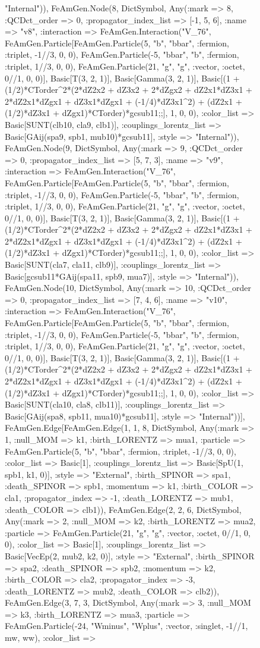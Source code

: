 \documentclass{revtex4}
\begin{document}
\begin{figure}[!htb]
\begin{center}
{"Internal")), FeAmGen.Node(8, Dict{Symbol, Any}(:mark => 8, :QCDct_order => 0, :propagator_index_list => [-1, 5, 6], :name => "v8", :interaction => FeAmGen.Interaction("V_76", FeAmGen.Particle[FeAmGen.Particle(5, "b", "bbar", :fermion, :triplet, -1//3, 0, 0), FeAmGen.Particle(-5, "bbar", "b", :fermion, :triplet, 1//3, 0, 0), FeAmGen.Particle(21, "g", "g", :vector, :octet, 0//1, 0, 0)], Basic[T(3, 2, 1)], Basic[Gamma(3, 2, 1)], Basic[(1 + (1/2)*CTorder^2*(2*dZ2x2 + dZ3x2 + 2*dZgx2 + dZ2x1*dZ3x1 + 2*dZ2x1*dZgx1 + dZ3x1*dZgx1 + (-1/4)*dZ3x1^2) + (dZ2x1 + (1/2)*dZ3x1 + dZgx1)*CTorder)*gcsub11;;], 1, 0, 0), :color_list => Basic[SUNT(clb10, cla9, clb1)], :couplings_lorentz_list => Basic[GAij(spa9, spb1, mub10)*gcsub11], :style => "Internal")), FeAmGen.Node(9, Dict{Symbol, Any}(:mark => 9, :QCDct_order => 0, :propagator_index_list => [5, 7, 3], :name => "v9", :interaction => FeAmGen.Interaction("V_76", FeAmGen.Particle[FeAmGen.Particle(5, "b", "bbar", :fermion, :triplet, -1//3, 0, 0), FeAmGen.Particle(-5, "bbar", "b", :fermion, :triplet, 1//3, 0, 0), FeAmGen.Particle(21, "g", "g", :vector, :octet, 0//1, 0, 0)], Basic[T(3, 2, 1)], Basic[Gamma(3, 2, 1)], Basic[(1 + (1/2)*CTorder^2*(2*dZ2x2 + dZ3x2 + 2*dZgx2 + dZ2x1*dZ3x1 + 2*dZ2x1*dZgx1 + dZ3x1*dZgx1 + (-1/4)*dZ3x1^2) + (dZ2x1 + (1/2)*dZ3x1 + dZgx1)*CTorder)*gcsub11;;], 1, 0, 0), :color_list => Basic[SUNT(cla7, cla11, clb9)], :couplings_lorentz_list => Basic[gcsub11*GAij(spa11, spb9, mua7)], :style => "Internal")), FeAmGen.Node(10, Dict{Symbol, Any}(:mark => 10, :QCDct_order => 0, :propagator_index_list => [7, 4, 6], :name => "v10", :interaction => FeAmGen.Interaction("V_76", FeAmGen.Particle[FeAmGen.Particle(5, "b", "bbar", :fermion, :triplet, -1//3, 0, 0), FeAmGen.Particle(-5, "bbar", "b", :fermion, :triplet, 1//3, 0, 0), FeAmGen.Particle(21, "g", "g", :vector, :octet, 0//1, 0, 0)], Basic[T(3, 2, 1)], Basic[Gamma(3, 2, 1)], Basic[(1 + (1/2)*CTorder^2*(2*dZ2x2 + dZ3x2 + 2*dZgx2 + dZ2x1*dZ3x1 + 2*dZ2x1*dZgx1 + dZ3x1*dZgx1 + (-1/4)*dZ3x1^2) + (dZ2x1 + (1/2)*dZ3x1 + dZgx1)*CTorder)*gcsub11;;], 1, 0, 0), :color_list => Basic[SUNT(cla10, cla8, clb11)], :couplings_lorentz_list => Basic[GAij(spa8, spb11, mua10)*gcsub11], :style => "Internal"))], FeAmGen.Edge[FeAmGen.Edge(1, 1, 8, Dict{Symbol, Any}(:mark => 1, :null_MOM => k1, :birth_LORENTZ => mua1, :particle => FeAmGen.Particle(5, "b", "bbar", :fermion, :triplet, -1//3, 0, 0), :color_list => Basic[1], :couplings_lorentz_list => Basic[SpU(1, spb1, k1, 0)], :style => "External", :birth_SPINOR => spa1, :death_SPINOR => spb1, :momentum => k1, :birth_COLOR => cla1, :propagator_index => -1, :death_LORENTZ => mub1, :death_COLOR => clb1)), FeAmGen.Edge(2, 2, 6, Dict{Symbol, Any}(:mark => 2, :null_MOM => k2, :birth_LORENTZ => mua2, :particle => FeAmGen.Particle(21, "g", "g", :vector, :octet, 0//1, 0, 0), :color_list => Basic[1], :couplings_lorentz_list => Basic[VecEp(2, mub2, k2, 0)], :style => "External", :birth_SPINOR => spa2, :death_SPINOR => spb2, :momentum => k2, :birth_COLOR => cla2, :propagator_index => -3, :death_LORENTZ => mub2, :death_COLOR => clb2)), FeAmGen.Edge(3, 7, 3, Dict{Symbol, Any}(:mark => 3, :null_MOM => k3, :birth_LORENTZ => mua3, :particle => FeAmGen.Particle(-24, "Wminus", "Wplus", :vector, :singlet, -1//1, mw, ww), :color_list => }
\end{center}
\end{figure}
\end{document}
